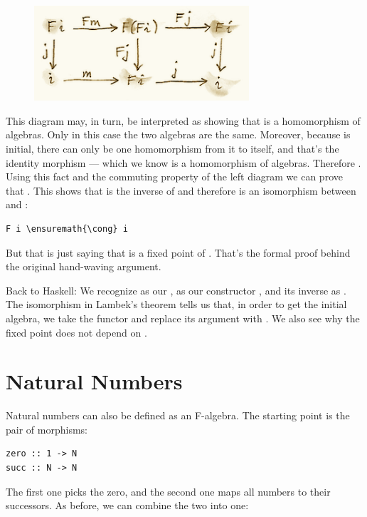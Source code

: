 \begin{figure}[H]
\centering
\includegraphics[width=80mm]{images/alg4.png}
\end{figure}

\noindent
This diagram may, in turn, be interpreted as showing that
 is a homomorphism of algebras. Only in this case the
two algebras are the same. Moreover, because  is
initial, there can only be one homomorphism from it to itself, and
that's the identity morphism  --- which we know is a
homomorphism of algebras. Therefore . Using this
fact and the commuting property of the left diagram we can prove that
. This shows that  is the inverse of
 and therefore  is an isomorphism between
 and :

\begin{Verbatim}[commandchars=\\\{\}]
F i \ensuremath{\cong} i
\end{Verbatim}
But that is just saying that  is a fixed point of .
That's the formal proof behind the original hand-waving argument.

Back to Haskell: We recognize  as our ,
 as our constructor , and its inverse as
. The isomorphism in Lambek's theorem tells us that, in
order to get the initial algebra, we take the functor  and
replace its argument  with . We also see why
the fixed point does not depend on .

\section{Natural Numbers}\label{natural-numbers}

Natural numbers can also be defined as an F-algebra. The starting point
is the pair of morphisms:

\begin{Verbatim}[commandchars=\\\{\}]
zero :: 1 -> N
succ :: N -> N
\end{Verbatim}
The first one picks the zero, and the second one maps all numbers to
their successors. As before, we can combine the two into one:

